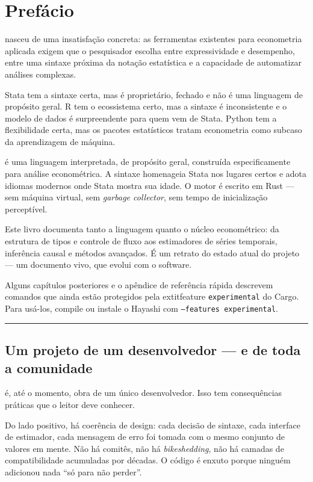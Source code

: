 \chapter*{Prefácio}

\hayashi{} nasceu de uma insatisfação concreta: as ferramentas existentes para econometria
aplicada exigem que o pesquisador escolha entre expressividade e desempenho, entre uma
sintaxe próxima da notação estatística e a capacidade de automatizar análises complexas.

Stata tem a sintaxe certa, mas é proprietário, fechado e não é uma linguagem de propósito
geral. R tem o ecossistema certo, mas a sintaxe é inconsistente e o modelo de dados é
surpreendente para quem vem de Stata. Python tem a flexibilidade certa, mas os pacotes
estatísticos tratam econometria como subcaso da aprendizagem de máquina.

\hayashi{} é uma linguagem interpretada, de propósito geral, construída especificamente
para análise econométrica. A sintaxe homenageia Stata nos lugares certos e adota idiomas
modernos onde Stata mostra sua idade. O motor é escrito em Rust — sem máquina virtual,
sem \textit{garbage collector}, sem tempo de inicialização perceptível.

\bigskip

Este livro documenta tanto a linguagem quanto o núcleo econométrico: da estrutura de
tipos e controle de fluxo aos estimadores de séries temporais, inferência causal e
métodos avançados. É um retrato do estado atual do projeto — um documento vivo, que
evolui com o software.

Alguns capítulos posteriores e o apêndice de referência rápida descrevem
comandos que ainda estão protegidos pela 	extit{feature} \texttt{experimental} do Cargo.
Para usá-los, compile ou instale o Hayashi com \texttt{--features experimental}.

\bigskip
\noindent\rule{\textwidth}{0.4pt}
\bigskip

\section*{Um projeto de um desenvolvedor — e de toda a comunidade}

\hayashi{} é, até o momento, obra de um único desenvolvedor. Isso tem consequências
práticas que o leitor deve conhecer.

Do lado positivo, há coerência de design: cada decisão de sintaxe, cada interface de
estimador, cada mensagem de erro foi tomada com o mesmo conjunto de valores em mente.
Não há comitês, não há \textit{bikeshedding}, não há camadas de compatibilidade
acumuladas por décadas. O código é enxuto porque ninguém adicionou nada ``só para não
perder''.

